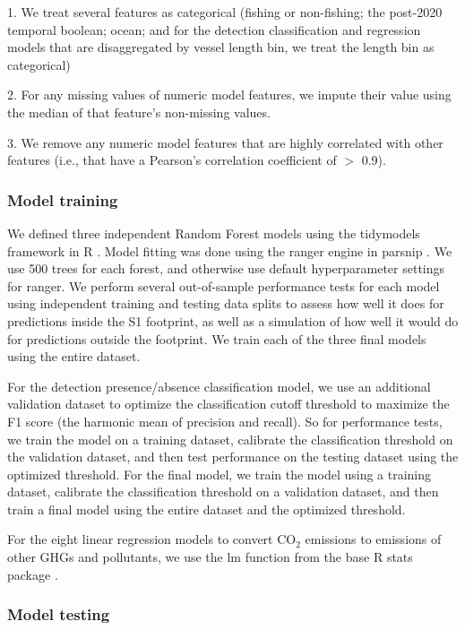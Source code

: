 \documentclass[lineno,pdflatex,sn-nature]{sn-jnl}
\begin{document}
1. We treat several features as categorical (fishing or non-fishing; the post-2020 temporal boolean; ocean; and for the detection classification and regression models that are disaggregated by vessel length bin, we treat the length bin as categorical)

2. For any missing values of numeric model features, we impute their value using the median of that feature's non-missing values.

3. We remove any numeric model features that are highly correlated with other features (i.e., that have a Pearson's correlation coefficient of $>$ 0.9).

\subsubsection{Model training}

We defined three independent Random Forest models using the tidymodels framework in R \cite{tidymodels}. Model fitting was done using the ranger engine \cite{ranger} in parsnip \cite{parsnip}. We  use 500 trees for each forest, and otherwise use default hyperparameter settings for ranger. We perform several out-of-sample performance tests for each model using independent training and testing data splits to assess how well it does for predictions inside the S1 footprint, as well as a simulation of how well it would do for predictions outside the footprint. We train each of the three final models using the entire dataset.

For the detection presence/absence classification model, we use an additional validation dataset to optimize the classification cutoff threshold to maximize the F1 score (the harmonic mean of precision and recall). So for performance tests, we train the model on a training dataset, calibrate the classification threshold on the validation dataset, and then test performance on the testing dataset using the optimized threshold. For the final model, we train the model using a training dataset, calibrate the classification threshold on a validation dataset, and then train a final model using the entire dataset and the optimized threshold.

For the eight linear regression models to convert CO$_2$ emissions to emissions of other GHGs and pollutants, we use the lm function from the base R stats package \cite{r}.

\subsubsection{Model testing}
\end{document}
